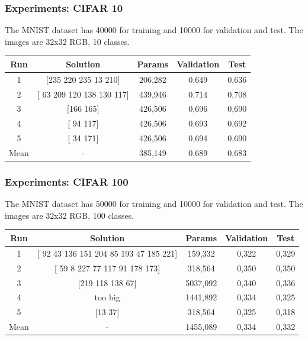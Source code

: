 \documentclass[aspectratio=169]{beamer}
\begin{document}
		\begin{frame}
			\frametitle{Experiments: CIFAR 10}
			
			The MNIST dataset has 40000 for training and 10000 for validation and test. The images are 32x32 RGB, 10 classes.
			
			\begin{table}
				\begin{tabular}{c|c|c|c|c}
					\hline
					Run  &         Solution          & Params  & Validation & Test  \\ \hline
					 1   &   [235 220 235  13 210]   & 206,282 &   0,649    & 0,636 \\
					 2   & [ 63 209 120 138 130 117] & 439,946 &   0,714    & 0,708 \\
					 3   &         [166 165]         & 426,506 &   0,696    & 0,690 \\
					 4   &         [ 94 117]         & 426,506 &   0,693    & 0,692 \\
					 5   &         [ 34 171]         & 426,506 &   0,694    & 0,690 \\
					Mean &             -             & 385,149 &   0,689    & 0,683 \\ \hline
				\end{tabular}
			\end{table}
		
		\end{frame}
		\begin{frame}
			\frametitle{Experiments: CIFAR 100}
			
			The MNIST dataset has 50000 for training and 10000 for validation and test. The images are 32x32 RGB, 100 classes.
		
			\begin{table}
				\begin{tabular}{c|c|c|c|c}
					\hline
					Run  &                 Solution                  &  Params  & Validation & Test  \\ \hline
					 1   & [ 92  43 136 151 204  85 193  47 185 221] & 159,332  &   0,322    & 0,329 \\
					 2   &     [ 59   8 227  77 117  91 178 173]     & 318,564  &   0,350    & 0,350 \\
					 3   &             [219 118 138  67]             & 5037,092 &   0,340    & 0,336 \\
					 4   &                  too big                  & 1441,892 &   0,334    & 0,325 \\
					 5   &                  [13 37]                  & 318,564  &   0,325    & 0,318 \\
					Mean &                     -                     & 1455,089 &   0,334    & 0,332 \\ \hline
				\end{tabular}
			\end{table}
		
		\end{frame}
\end{document}
